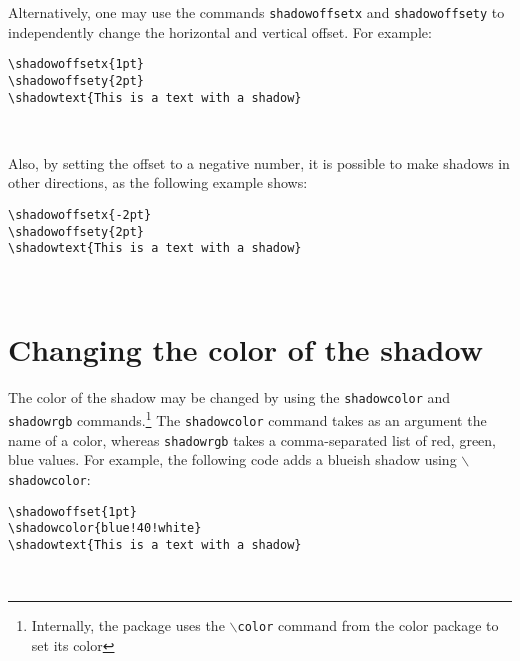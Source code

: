 \documentclass{article}
\begin{document}
Alternatively, one may use the commands {\tt shadowoffsetx} and {\tt shadowoffsety} to independently change
the horizontal and vertical offset. For example:

\begin{minipage}{\textwidth}
\begin{multicols*}{2} 
{\footnotesize
\begin{verbatim}
\shadowoffsetx{1pt}
\shadowoffsety{2pt}
\shadowtext{This is a text with a shadow}
\end{verbatim}}

\shadowoffsetx{1pt}
\shadowoffsety{2pt}
\\
\phantom{}
\end{multicols*}
\end{minipage}

Also, by setting the offset to a negative number, it is possible to 
make shadows in other directions, as the following example shows:

\begin{minipage}{\textwidth}
\begin{multicols*}{2} 
{\footnotesize
\begin{verbatim}
\shadowoffsetx{-2pt}
\shadowoffsety{2pt}
\shadowtext{This is a text with a shadow}
\end{verbatim}}

\shadowoffsetx{-2pt}
\shadowoffsety{2pt}
\\
\phantom{}
\end{multicols*}
\end{minipage}

\section{Changing the color of the shadow}
The color of the shadow may be changed by using the {\tt shadowcolor} and {\tt shadowrgb} commands.\footnote{Internally, the 
package uses the {\tt $\backslash$color} command from the color package to set its color} 
The {\tt shadowcolor} command takes as an argument the name of a color, whereas {\tt shadowrgb} takes a comma-separated list of red, green, blue
values. For example, the following code adds a blueish shadow using {\tt $\backslash$shadowcolor}:

\begin{minipage}{\textwidth}
\begin{multicols*}{2} 
{\footnotesize
\begin{verbatim}
\shadowoffset{1pt}
\shadowcolor{blue!40!white}
\shadowtext{This is a text with a shadow}
\end{verbatim}}

\shadowoffset{1pt}
\\
\phantom{}
\end{multicols*}
\end{minipage}
\end{document}
